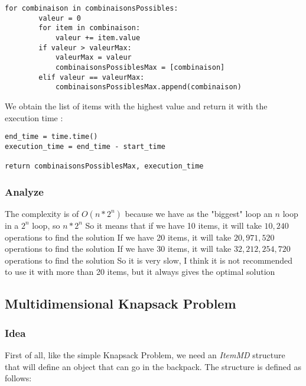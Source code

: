\documentclass[12pt]{article}
\begin{document}
            \bigskip
            \begin{lstlisting}
for combinaison in combinaisonsPossibles:
        valeur = 0
        for item in combinaison:
            valeur += item.value
        if valeur > valeurMax:
            valeurMax = valeur
            combinaisonsPossiblesMax = [combinaison]
        elif valeur == valeurMax:
            combinaisonsPossiblesMax.append(combinaison)
            \end{lstlisting}
            \bigskip
            
            We obtain the list of items with the highest value and return it with the execution time :

            \bigskip
            \begin{lstlisting}
end_time = time.time()
execution_time = end_time - start_time
    
return combinaisonsPossiblesMax, execution_time
            \end{lstlisting}
            \bigskip
            
        \subsubsection{Analyze}

            The complexity is of $O(n*2^n)$ because we have as the "biggest" loop an $n$ loop in a $2^n$ loop, so $n*2^n$\newline\newline
            So it means that if we have 10 items, it will take $10,240$ operations to find the solution\newline
            If we have 20 items, it will take $20,971,520$ operations to find the solution\newline
            If we have 30 items, it will take $32,212,254,720$ operations to find the solution\newline
            So it is very slow, I think it is not recommended to use it with more than 20 items, but it always gives the optimal solution

    \newpage
    \subsection{Multidimensional Knapsack Problem}

        \subsubsection{Idea}
            First of all, like the simple Knapsack Problem, we need an \emph{ItemMD} structure that will define an object that can go in the backpack. The structure is defined as follows:
\end{document}
